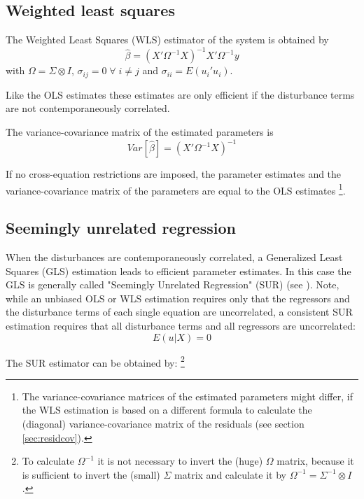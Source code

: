 \subsection{Weighted least squares}

The Weighted Least Squares (WLS) estimator of the system 
is obtained by
\begin{equation}
   \widehat{\beta} = \left( X' \Omega^{-1} X \right)^{-1} X' \Omega^{-1} y
\end{equation}
with $\Omega = \Sigma \otimes I$, 
$\sigma_{ij} = 0 \; \forall \; i \neq j$ and
$\sigma_{ii} = E \left( u_i' u_i \right)$.

Like the OLS estimates these estimates are only efficient 
if the disturbance terms are not contemporaneously correlated.

The variance-covariance matrix of the estimated parameters is
\begin{equation}
   Var \left[ \widehat{\beta} \right] = \left( X' \Omega^{-1} X \right)^{-1}
\end{equation}

If no cross-equation restrictions are imposed, 
the parameter estimates and the variance-covariance matrix 
of the parameters are equal to the OLS estimates%
\footnote{The variance-covariance matrices of the 
estimated parameters might differ, 
if the WLS estimation is based on a different formula 
to calculate the (diagonal) variance-covariance 
matrix of the residuals (see section \ref{sec:residcov}).}.  

\subsection{Seemingly unrelated regression}

When the disturbances are contemporaneously correlated, a Generalized 
Least Squares (GLS) estimation leads to efficient parameter estimates.
In this case the GLS is generally called "Seemingly Unrelated Regression" 
(SUR) (see \citealp{zellner62}). 
Note, while an unbiased OLS or WLS estimation requires only that 
the regressors and the disturbance terms of each single 
equation are uncorrelated,
a consistent SUR estimation requires that all disturbance terms and all 
regressors are uncorrelated:
\begin{equation}
   E \left( u | X \right) = 0
\end{equation}

The SUR estimator can be obtained by:%
\footnote{To calculate $\Omega^{-1}$ it is not necessary to invert 
the (huge) $\Omega$ matrix, 
because it is sufficient to invert the (small) $\Sigma$ matrix and
calculate it by $\Omega^{-1} = \Sigma^{-1} \otimes I$.}

